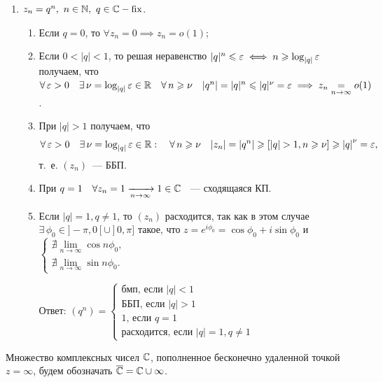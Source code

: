 \documentclass[../../main.tex]{subfiles}
\begin{document}
\begin{exmp}
	\;
	\begin{enumerate}
		\item $ z_n = q^n,\ n \in \mathbb{N},\ q \in \mathbb{C} - \operatorname{fix} $.
		
		\begin{enumerate}
			\item Если $ q = 0 $, то $ \forall z_n = 0 \implies z_n = o(1) $;
			
			\item Если $ 0 < |q| < 1 $, то решая неравенство $ |q|^n \leqslant \varepsilon \iff 
			n \geqslant \log_{|q|}\varepsilon $ получаем, что $ \forall\, \varepsilon > 0 \quad \exists\, 
			\nu = \log_{|q|}\varepsilon \in \mathbb{R} \quad \forall\, n \geqslant \nu \quad |q^n| = 
			|q|^n \leqslant |q|^\nu = \varepsilon \implies z_n \underset{n \to \infty}{=} o(1) $.
			
			\item При $ |q| > 1 $ получаем, что \[\forall\, \varepsilon > 0 \quad \exists\, 
			\nu = \log_{|q|}\varepsilon \in \mathbb{R}: \quad \forall\, n \geqslant \nu \quad |z_n| = 
			|q^n| \geqslant [|q| > 1, n \geqslant \nu] \geqslant {|q|}^{\nu} = \varepsilon,\] т.~е. $(z_n)$~--- ББП.
			
			\item При $ q = 1 \quad \forall z_n = 1 \xrightarrow[n \rightarrow \infty]{} 1 \in 
			\mathbb{C} $ ~--- сходящаяся КП.
			
			\item Если $ |q| = 1, q \neq 1 $, то $ (z_n) $ расходится, так как в этом 
			случае $ \exists\, \phi_0 \in ]-\pi, 0[ \cup ]0, \pi] $ такое, что $ z = 
			e^{i\phi_0} = \cos{\phi_0} + i\sin{\phi_0} $ и 
			$ \begin{cases}
				\nexists \underset{n \to \infty}{\lim} \cos{n\phi_0}, \\
				\nexists \underset{n \to \infty}{\lim} \sin{n\phi_0}.
			\end{cases} $
			
			Ответ: 
			$ (q^n) = \begin{cases}
				\text{бмп, если } |q| < 1 \\
				\text{ББП, если } |q| > 1 \\
				1 \text{, если } q = 1 \\
				\text{расходится, если } |q| = 1, q \neq 1
			\end{cases} $
		\end{enumerate}
	\end{enumerate}
\end{exmp}

Множество комплексных чисел $ \mathbb{C} $, пополненное бесконечно удаленной точкой $ 
z = \infty $, будем обозначать $ \overline{\mathbb{C}} = \mathbb{C} \cup {\infty} $.
\end{document}
